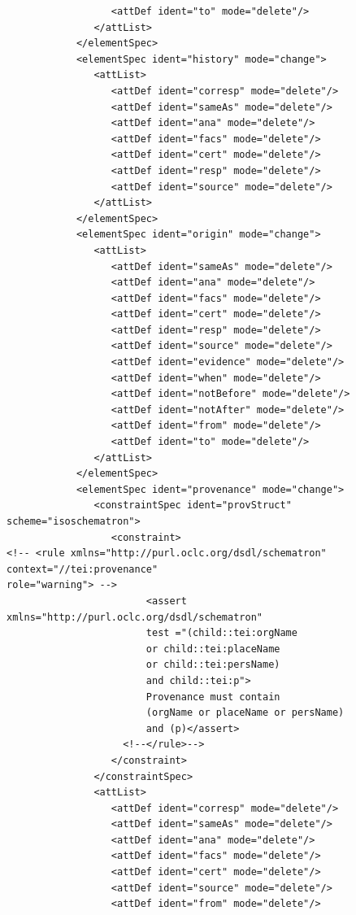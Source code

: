 \documentclass[a4paper,12pt,twoside]{book}
\begin{document}
\begin{verbatim}
                  <attDef ident="to" mode="delete"/>
               </attList>
            </elementSpec>
            <elementSpec ident="history" mode="change">
               <attList>
                  <attDef ident="corresp" mode="delete"/>
                  <attDef ident="sameAs" mode="delete"/>
                  <attDef ident="ana" mode="delete"/>
                  <attDef ident="facs" mode="delete"/>
                  <attDef ident="cert" mode="delete"/>
                  <attDef ident="resp" mode="delete"/>
                  <attDef ident="source" mode="delete"/>
               </attList>
            </elementSpec>
            <elementSpec ident="origin" mode="change">
               <attList>
                  <attDef ident="sameAs" mode="delete"/>
                  <attDef ident="ana" mode="delete"/>
                  <attDef ident="facs" mode="delete"/>
                  <attDef ident="cert" mode="delete"/>
                  <attDef ident="resp" mode="delete"/>
                  <attDef ident="source" mode="delete"/>
                  <attDef ident="evidence" mode="delete"/>
                  <attDef ident="when" mode="delete"/>
                  <attDef ident="notBefore" mode="delete"/>
                  <attDef ident="notAfter" mode="delete"/>
                  <attDef ident="from" mode="delete"/>
                  <attDef ident="to" mode="delete"/>
               </attList>
            </elementSpec>
            <elementSpec ident="provenance" mode="change">
               <constraintSpec ident="provStruct" scheme="isoschematron">
                  <constraint>
<!-- <rule xmlns="http://purl.oclc.org/dsdl/schematron" context="//tei:provenance" 
role="warning"> -->
                        <assert xmlns="http://purl.oclc.org/dsdl/schematron" 
                        test ="(child::tei:orgName 
                        or child::tei:placeName 
                        or child::tei:persName)
                        and child::tei:p">
                        Provenance must contain 
                        (orgName or placeName or persName) 
                        and (p)</assert>
                    <!--</rule>-->
                  </constraint>
               </constraintSpec>
               <attList>
                  <attDef ident="corresp" mode="delete"/>
                  <attDef ident="sameAs" mode="delete"/>
                  <attDef ident="ana" mode="delete"/>
                  <attDef ident="facs" mode="delete"/>
                  <attDef ident="cert" mode="delete"/>
                  <attDef ident="source" mode="delete"/>
                  <attDef ident="from" mode="delete"/>

\end{verbatim}
\end{document}
